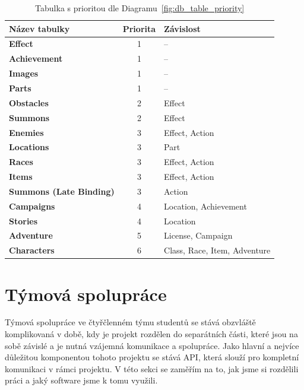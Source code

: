\begin{table}[H]
    \centering
        \begin{tabular}{l c l}
            \toprule

            \textbf{Název tabulky} & \textbf{Priorita} & \textbf{Závislost} \\
            \midrule

            \textbf{Effect} & 1 & -- \\
            \textbf{Achievement} & 1 & -- \\
            \textbf{Images} & 1 & -- \\
            \textbf{Parts} & 1 & -- \\
            \textbf{Obstacles} & 2 & Effect \\
            \textbf{Summons} & 2 & Effect \\
            \textbf{Enemies} & 3 & Effect, Action \\
            \textbf{Locations} & 3 & Part \\
            \textbf{Races} & 3 & Effect, Action \\
            \textbf{Items} & 3 & Effect, Action \\
            \textbf{Summons (Late Binding)} & 3 & Action \\
            \textbf{Campaigns} & 4 & Location, Achievement \\
            \textbf{Stories} & 4 & Location \\
            \textbf{Adventure} & 5 & License, Campaign \\
            \textbf{Characters} & 6 & Class, Race, Item, Adventure \\

            \bottomrule
        \end{tabular}
    \caption{Tabulka s prioritou dle Diagramu~\ref{fig:db_table_priority}
    \label{tab:db_table_priority}}
\end{table}

\section{Týmová spolupráce}
\label{sec:implementation-collaboration}
Týmová spolupráce ve čtyřčlenném týmu studentů se stává obzvláště komplikovaná v době, kdy je projekt rozdělen do separátních části, které jsou na sobě závislé a je nutná vzájemná komunikace a spolupráce. Jako hlavní a nejvíce důležitou komponentou tohoto projektu se stává API, která slouží pro kompletní komunikaci v rámci projektu. V této sekci se zaměřím na to, jak jsme si rozdělili práci a jaký software jsme k tomu využili.

